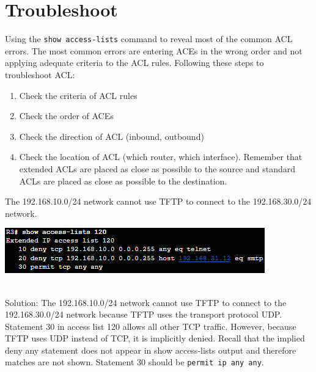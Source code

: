 \section{Troubleshoot}
Using the \texttt{show access-lists} command to reveal most of the common ACL errors. The most common errors are entering ACEs in the wrong order and not applying adequate criteria to the ACL rules. Following these steps to troubleshoot ACL:
\begin{enumerate}
\item Check the criteria of ACL rules
\item Check the order of ACEs
\item Check the direction of ACL (inbound, outbound)
\item Check the location of ACL (which router, which interface). Remember that extended ACLs are placed as close as possible to the source and standard ACLs are placed as close as possible to the destination.
\end{enumerate}
\begin{example}
The 192.168.10.0/24 network cannot use TFTP to connect to the 192.168.30.0/24 network.\\
\begin{listing}
\includegraphics[scale=1]{pictures/example2.PNG} 
\end{listing}\\
Solution: The 192.168.10.0/24 network cannot use TFTP to connect to the 192.168.30.0/24 network because TFTP uses the transport protocol UDP. Statement 30 in access list 120 allows all other TCP traffic. However, because TFTP uses UDP instead of TCP, it is implicitly denied. Recall that the implied deny any statement does not appear in show access-lists output and therefore matches are not shown. Statement 30 should be \texttt{permit ip any any}.
\end{example}

